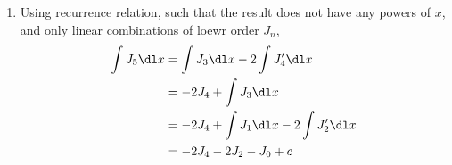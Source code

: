 \begin{enumerate}
    \item Using recurrence relation, such that the result does not have any powers of
          $ x $, and only linear combinations of loewr order $ J_n $,
          \begin{align}
              \int J_5 \dl x & = \int J_3 \dl x - 2 \int J_4' \dl x         \\
                             & = -2J_4 + \int J_3 \dl x                     \\
                             & = -2J_4 + \int J_1 \dl x - 2 \int J_2' \dl x \\
                             & = -2J_4 - 2J_2 - J_0 + c
          \end{align}
\end{enumerate}
